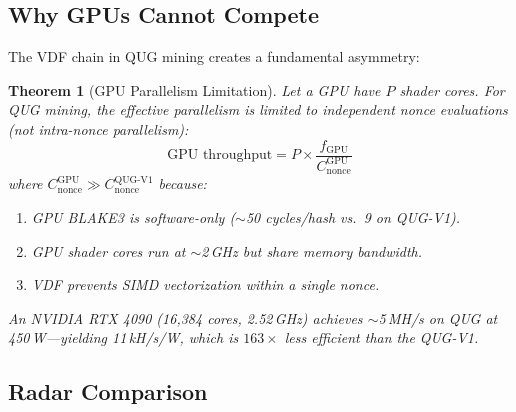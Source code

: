 \documentclass[11pt,a4paper]{article}
\newtheorem{theorem}{Theorem}[section]
\begin{document}
\subsection{Why GPUs Cannot Compete}

The VDF chain in QUG mining creates a fundamental asymmetry:

\begin{theorem}[GPU Parallelism Limitation]
Let a GPU have $P$ shader cores. For QUG mining, the effective parallelism is limited to independent nonce evaluations (not intra-nonce parallelism):
\begin{equation}
    \text{GPU throughput} = P \times \frac{f_{\text{GPU}}}{C_{\text{nonce}}^{\text{GPU}}}
\end{equation}
where $C_{\text{nonce}}^{\text{GPU}} \gg C_{\text{nonce}}^{\text{QUG-V1}}$ because:
\begin{enumerate}
    \item GPU BLAKE3 is software-only ($\sim$50 cycles/hash vs.\ 9 on QUG-V1).
    \item GPU shader cores run at $\sim$2\,GHz but share memory bandwidth.
    \item VDF prevents SIMD vectorization within a single nonce.
\end{enumerate}
An NVIDIA RTX 4090 (16,384 cores, 2.52\,GHz) achieves $\sim$5\,MH/s on QUG at 450\,W---yielding 11\,kH/s/W, which is $163\times$ less efficient than the QUG-V1.
\end{theorem}

\subsection{Radar Comparison}
\end{document}
